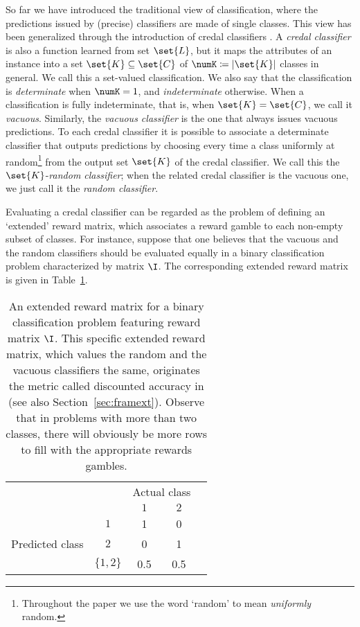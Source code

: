 \documentclass[a4paper,10pt,reqno]{amsart}
\theoremstyle{remark}
\begin{document}
So far we have introduced the traditional view of classification, where the predictions issued by (precise) classifiers are made of single classes. This view has been generalized through the introduction of credal classifiers \cite{zaffalon1999a,zaffalon2002a}. A \emph{credal classifier} is also a function learned from set $\set{L}$, but it maps the attributes of an instance into a set $\set{K}\subseteq\set{C}$ of $\numK\coloneqq |\set{K}|$ classes in general. We call this a set-valued classification. We also say that the classification is \emph{determinate} when $\numK=1$, and \emph{indeterminate} otherwise. When a classification is fully indeterminate, that is, when $\set{K}=\set{C}$, we call it \emph{vacuous}. Similarly, the \emph{vacuous classifier} is the one that always issues vacuous predictions. To each credal classifier it is possible to associate a determinate classifier that outputs predictions by choosing every time a class uniformly at random\footnote{Throughout the paper we use the word `random' to mean \emph{uniformly} random.} from the output set $\set{K}$ of the credal classifier. We call this the $\set{K}$-\emph{random classifier}; when the related credal classifier is the vacuous one, we just call it the \emph{random classifier}.

Evaluating a credal classifier can be regarded as the problem of defining an `extended' reward matrix, which associates a reward gamble to each non-empty subset of classes. For instance, suppose that one believes that the vacuous and the random classifiers should be evaluated equally in a binary classification problem characterized by matrix $\I$. The corresponding extended reward matrix is given in Table~\ref{tab:binary-erm}.
\begin{table}[htp]
  \centering
\begin{tabular}{cc|ccc}
& & \multicolumn{2}{c}{Actual class} \\ %
& & $1$ & $2$ \\ \cline{1-4}
\multicolumn{1}{c}{\multirow{3}{*}{Predicted class}} &
\multicolumn{1}{c|}{$1$} & 1 & 0     \\ %
\multicolumn{1}{c}{} &
\multicolumn{1}{c|}{$2$} & 0 & 1\\ %
\multicolumn{1}{c}{}&{$\{1,2\}$} & 0.5 & 0.5
\end{tabular}
  \caption{An extended reward matrix for a binary classification problem featuring reward matrix $\I$. This specific extended reward matrix, which values the random and the vacuous classifiers the same, originates the metric called discounted accuracy in \cite{corani2009b} (see also Section~\ref{sec:framext}). Observe that in problems with more than two classes, there will obviously be more rows to fill with the appropriate rewards gambles.}
  \label{tab:binary-erm}
\end{table}
\end{document}
